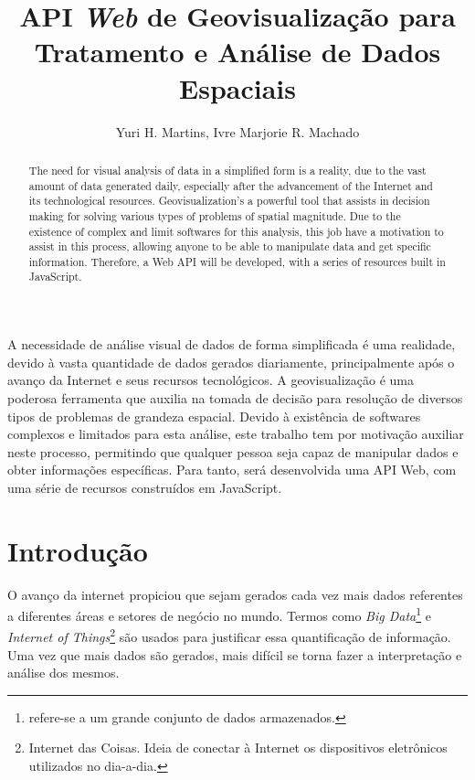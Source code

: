 \documentclass[12pt]{article}
\title{API \emph{Web} de Geovisualização para Tratamento e Análise de Dados Espaciais}
\author{Yuri H. Martins\inst{1}, Ivre Marjorie R. Machado\inst{1}}
\begin{document}
 

\maketitle

\begin{resumo} 

A necessidade de análise visual de dados de forma simplificada é uma realidade, devido à vasta quantidade de dados gerados diariamente, principalmente após o avanço da Internet e seus recursos tecnológicos. A geovisualização é uma poderosa ferramenta que auxilia na tomada de decisão para resolução de diversos tipos de problemas de grandeza espacial. Devido à existência de softwares complexos e limitados para esta análise, este trabalho tem por motivação auxiliar neste processo, permitindo que qualquer pessoa seja capaz de manipular dados e obter informações específicas. Para tanto, será desenvolvida uma API Web, com uma série de recursos construídos em JavaScript.

\end{resumo}

\begin{abstract}

The need for visual analysis of data in a simplified form is a reality, due to the vast amount of data generated daily, especially after the advancement of the Internet and its technological resources. Geovisualization’s a powerful tool that assists in decision making for solving various types of problems of spatial magnitude. Due to the existence of complex and limit softwares for this analysis, this job have a motivation to assist in this process, allowing anyone to be able to manipulate data and get specific information. Therefore, a Web API will be developed, with a series of resources built in JavaScript.

\end{abstract}
     
\section{Introdução}

O avanço da internet propiciou que sejam gerados cada vez mais dados referentes a diferentes áreas e setores de negócio no mundo. Termos como \emph{Big Data}\footnote{refere-se a um grande conjunto de dados armazenados.} e \emph{Internet of Things}\footnote{Internet das Coisas. Ideia de conectar à Internet os dispositivos eletrônicos utilizados no dia-a-dia.} são usados para justificar essa quantificação de informação. Uma vez que mais dados são gerados, mais difícil se torna fazer a interpretação e análise dos mesmos.
\end{document}
